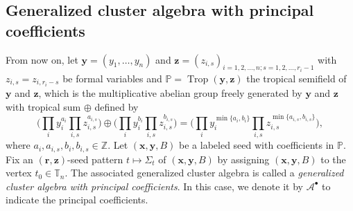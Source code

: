 \documentclass[10pt,a4paper]{amsart}
\newcommand{\Z}{\mathbb{Z}}
\numberwithin{equation}{section}
\begin{document}
\subsection{Generalized cluster algebra with principal coefficients}\label{ss:principal-gca}

From now on, let $\mathbf{y}=(y_1,\dots, y_n)$ and $\mathbf{z}=(z_{i,s})_{i=1,2,\dots,n;s=1,2,\dots,r_i-1}$ with $z_{i,s}=z_{i,r_{i}-s}$ be formal variables and $\mathbb{P}=\operatorname{Trop}(\mathbf{y},\mathbf{z})$ the tropical semifield of $\mathbf{y}$ and $\mathbf{z}$, which is the multiplicative abelian group freely
generated by $\mathbf{y}$ and $\mathbf{z}$ with tropical sum $\oplus$ defined by
\begin{equation*}
\biggl(\prod\limits_{i}y_i^{a_i}\prod\limits_{i,s}z_{i,s}^{a_{i,s}}\biggr)\oplus\biggl(\prod\limits_{i}y_i^{b_i}\prod\limits_{i,s}z_{i,s}^{b_{i,s}}\biggr)=\biggl(\prod\limits_{i}y_i^{\min\{a_i,b_i\}}\prod\limits_{i,s}z_{i,s}^{\min\{a_{i,s},b_{i,s}\}}\biggr),
\end{equation*}
where $a_i,a_{i,s},b_i,b_{i,s}\in \Z$. Let $(\mathbf{x},\mathbf{y}, B)$ be a labeled seed with coefficients in $\mathbb{P}$. Fix an $(\mathbf{r},\mathbf{z})$-seed pattern $t\mapsto \Sigma_t$ of $(\mathbf{x},\mathbf{y}, B)$ by assigning $(\mathbf{x},\mathbf{y}, B)$ to the vertex $t_0\in \mathbb{T}_n$. The associated generalized cluster algebra is called a {\it generalized cluster algebra with principal coefficients}. In this case, we denote it by $\mathcal{A}^\bullet$ to indicate the principal coefficients.
\end{document}
